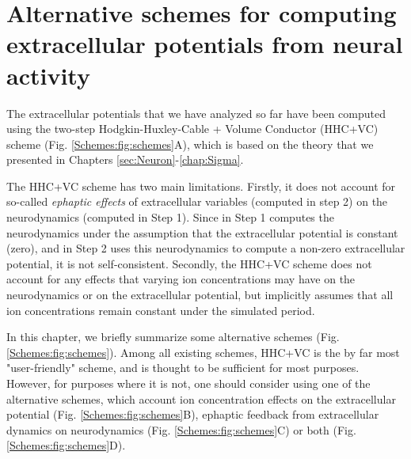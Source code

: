 \chapter{Alternative schemes for computing extracellular potentials from neural activity}
\label{chap:Schemes}

The extracellular potentials that we have analyzed so far have been computed using the two-step Hodgkin-Huxley-Cable + Volume Conductor (HHC+VC) scheme (Fig. \ref{Schemes:fig:schemes}A), which is based on the theory that we presented in Chapters \ref{sec:Neuron}-\ref{chap:Sigma}. 

The HHC+VC scheme has two main limitations. Firstly, it does not account for so-called \textit{ephaptic effects} of extracellular variables (computed in step 2) on the neurodynamics (computed in Step 1). Since in Step 1 computes the neurodynamics under the assumption that the extracellular potential is constant (zero), and in Step 2 uses this neurodynamics to compute a non-zero extracellular potential, it is not self-consistent. Secondly, the HHC+VC scheme does not account for any effects that varying ion concentrations may have on the neurodynamics or on the extracellular potential, but implicitly assumes that all ion concentrations remain constant under the simulated period.

In this chapter, we briefly summarize some alternative schemes (Fig. \ref{Schemes:fig:schemes}).
Among all existing schemes, HHC+VC is the by far most "user-friendly" scheme, and is thought to be sufficient for most purposes. However, for purposes where it is not, one should consider using one of the alternative schemes, which account ion concentration effects on the extracellular potential (Fig. \ref{Schemes:fig:schemes}B), ephaptic feedback from extracellular dynamics on neurodynamics (Fig. \ref{Schemes:fig:schemes}C) or both (Fig. \ref{Schemes:fig:schemes}D).


